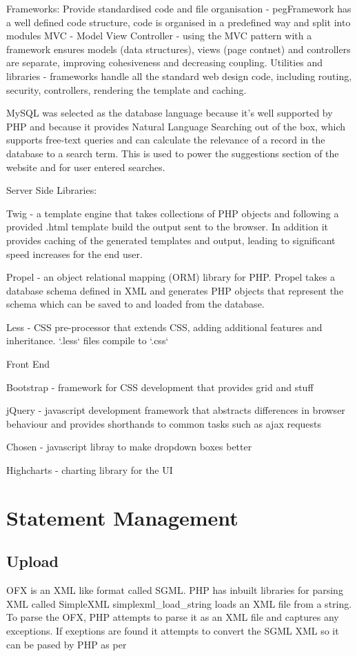 Frameworks:
Provide standardised code and file organisation - pegFramework has a well defined code structure, code is organised in a predefined way and split into modules
MVC - Model View Controller - using the MVC pattern with a framework ensures models (data structures), views (page contnet) and controllers are separate, improving cohesiveness and decreasing coupling.
Utilities and libraries - frameworks handle all the standard web design code, including routing, security, controllers, rendering the template and caching.

MySQL was selected as the database language because it's well supported by PHP and because it provides Natural Language Searching out of the box, which supports free-text queries and can calculate the relevance of a record in the database to a search term. This is used to power the suggestions section of the website and for user entered searches.

Server Side Libraries:

Twig - a template engine that takes collections of PHP objects and following a provided .html template build the output sent to the browser. In addition it provides caching of the generated templates and output, leading to significant speed increases for the end user.

Propel - an object relational mapping (ORM) library for PHP. Propel takes a database schema defined in XML and generates PHP objects that represent the schema which can be saved to and loaded from the database.

Less - CSS pre-processor that extends CSS, adding additional features and inheritance. `.less` files compile to `.css`

Front End

Bootstrap - framework for CSS development that provides grid and stuff

jQuery - javascript development framework that abstracts differences in browser behaviour and provides shorthands to common tasks such as ajax requests



Chosen - javascript libray to make dropdown boxes better

Highcharts - charting library for the UI

\section[Statements]{Statement Management}

\subsection{Upload}
OFX is an XML like format called SGML. PHP has inbuilt libraries for parsing XML called SimpleXML simplexml\_load\_string loads an XML file from a string. To parse the OFX, PHP attempts to parse it as an XML file and captures any exceptions. If exeptions are found it attempts to convert the SGML XML so it can be pased by PHP as per 

